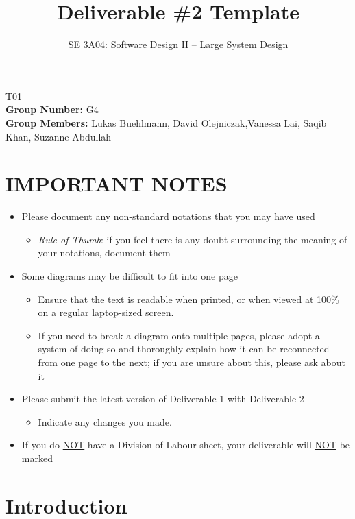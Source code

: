 \documentclass[]{article}
\title{Deliverable \#2 Template}
\author{SE 3A04: Software Design II -- Large System Design}
\date{}
\begin{document}
\maketitle	
{} T01\\
{\bf Group Number:} G4 \\
{\bf Group Members:} Lukas Buehlmann, David Olejniczak,Vanessa Lai, Saqib Khan, Suzanne Abdullah


\section*{IMPORTANT NOTES}
\begin{itemize}
	\item Please document any non-standard notations that you may have used
	\begin{itemize}
		\item \emph{Rule of Thumb}: if you feel there is any doubt surrounding the meaning of your notations, document them
	\end{itemize}
	\item Some diagrams may be difficult to fit into one page
	\begin{itemize}
		\item Ensure that the text is readable when printed, or when viewed at 100\% on a regular laptop-sized screen.
		\item If you need to break a diagram onto multiple pages, please adopt a system of doing so and thoroughly explain how it can be reconnected from one page to the next; if you are unsure about this, please ask about it
	\end{itemize}
	\item Please submit the latest version of Deliverable 1 with Deliverable 2
	\begin{itemize}
		\item Indicate any changes you made.
	\end{itemize}
	\item If you do \underline{NOT} have a Division of Labour sheet, your deliverable will \underline{NOT} be marked
\end{itemize}

\newpage
\section{Introduction}
\label{sec:introduction}
\end{document}
